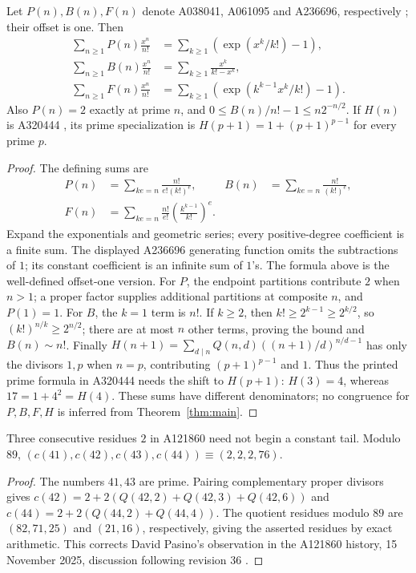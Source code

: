 \begin{corollary}\label{cor:other}
Let $P(n),B(n),F(n)$ denote A038041, A061095 and A236696,
respectively \cite{other}; their offset is one. Then
\begin{align*}
 \sum_{n\geq1}P(n)\frac{x^n}{n!}
   &=\sum_{k\geq1}\left(\exp(x^k/k!)-1\right),\\
 \sum_{n\geq1}B(n)\frac{x^n}{n!}
   &=\sum_{k\geq1}\frac{x^k}{k!-x^k},\\
 \sum_{n\geq1}F(n)\frac{x^n}{n!}
   &=\sum_{k\geq1}\left(\exp(k^{k-1}x^k/k!)-1\right).
\end{align*}
Also $P(n)=2$ exactly at prime $n$, and
$0\leq B(n)/n!-1\leq n2^{-n/2}$.
If $H(n)$ is A320444 \cite{a320444}, its prime specialization is
$H(p+1)=1+(p+1)^{p-1}$ for every prime $p$.
\end{corollary}
\begin{proof}
The defining sums are
\begin{align*}
 P(n)&=\sum_{ke=n}\frac{n!}{e!(k!)^e},&
 B(n)&=\sum_{ke=n}\frac{n!}{(k!)^e},\\
 F(n)&=\sum_{ke=n}\frac{n!}{e!}\left(\frac{k^{k-1}}{k!}\right)^e.
\end{align*}
Expand the exponentials and geometric series; every positive-degree
coefficient is a finite sum. The displayed A236696 generating function
omits the subtractions of $1$; its constant coefficient is an infinite
sum of $1$'s. The formula above is the well-defined offset-one version.
For $P$, the endpoint partitions contribute $2$ when $n>1$;
a proper factor supplies additional partitions at composite $n$, and $P(1)=1$.
For $B$, the $k=1$ term is $n!$. If $k\geq2$, then
$k!\geq2^{k-1}\geq2^{k/2}$, so $(k!)^{n/k}\geq2^{n/2}$;
there are at most $n$ other terms, proving the bound and $B(n)\sim n!$.
Finally
$H(n+1)=\sum_{d\mid n}Q(n,d)((n+1)/d)^{n/d-1}$
has only the divisors $1,p$ when $n=p$, contributing
$(p+1)^{p-1}$ and $1$. Thus the printed prime formula in A320444
needs the shift to $H(p+1)$: $H(3)=4$, whereas $17=1+4^2=H(4)$.
These sums have different denominators; no congruence for $P,B,F,H$
is inferred from Theorem~\ref{thm:main}.
\end{proof}

\begin{corollary}\label{cor:three}
Three consecutive residues $2$ in A121860 need not begin a constant tail.
Modulo $89$, $(c(41),c(42),c(43),c(44))\equiv(2,2,2,76)$.
\end{corollary}
\begin{proof}
The numbers $41,43$ are prime. Pairing complementary proper divisors gives
$c(42)=2+2(Q(42,2)+Q(42,3)+Q(42,6))$ and
$c(44)=2+2(Q(44,2)+Q(44,4))$.
The quotient residues modulo $89$ are $(82,71,25)$ and $(21,16)$,
respectively, giving the asserted residues by exact arithmetic.
This corrects David Pasino's observation in the A121860 history,
15 November 2025, discussion following revision 36 \cite{history}.
\end{proof}

